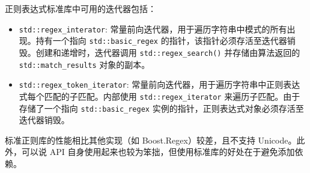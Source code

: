 正则表达式标准库中可用的迭代器包括：

\begin{itemize}
\item
\verb|std::regex_interator|: 常量前向迭代器，用于遍历字符串中模式的所有出现。持有一个指向 \verb|std::basic_regex| 的指针，该指针必须存活至迭代器销毁。创建和递增时，迭代器调用 \verb|std::regex_search()| 并存储由算法返回的 \verb|std::match_results| 对象的副本。

\item
\verb|std::regex_token_iterator|: 常量前向迭代器，用于遍历字符串中正则表达式每个匹配的子匹配。内部使用 \verb|std::regex_iterator| 来遍历子匹配。由于存储了一个指向 \verb|std::basic_regex| 实例的指针，正则表达式对象必须存活至迭代器销毁。
\end{itemize}

标准正则库的性能相比其他实现（如 Boost.Regex）较差，且不支持 Unicode。此外，可以说 API 自身使用起来也较为笨拙，但使用标准库的好处在于避免添加依赖。









